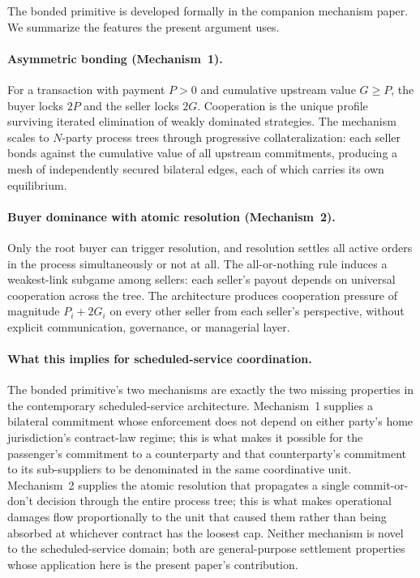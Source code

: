 \documentclass[11pt,a4paper]{article}
\theoremstyle{definition}
\theoremstyle{remark}
\newcommand{\pay}{P}
\newcommand{\cumval}{G}
\begin{document}
The bonded primitive is developed formally in the companion
mechanism paper. We summarize the features the present argument
uses.

\paragraph{Asymmetric bonding (Mechanism~1).}
For a transaction with payment $\pay > 0$ and cumulative upstream
value $\cumval \geq \pay$, the buyer locks $2\pay$ and the seller
locks $2\cumval$. Cooperation is the unique profile surviving
iterated elimination of weakly dominated strategies. The
mechanism scales to $N$-party process trees through progressive
collateralization: each seller bonds against the cumulative value
of all upstream commitments, producing a mesh of independently
secured bilateral edges, each of which carries its own
equilibrium.

\paragraph{Buyer dominance with atomic resolution (Mechanism~2).}
Only the root buyer can trigger resolution, and resolution
settles all active orders in the process simultaneously or not at
all. The all-or-nothing rule induces a weakest-link subgame among
sellers: each seller's payout depends on universal cooperation
across the tree. The architecture produces cooperation pressure
of magnitude $\pay_i + 2\cumval_i$ on every other seller from
each seller's perspective, without explicit communication,
governance, or managerial layer.

\paragraph{What this implies for scheduled-service coordination.}
The bonded primitive's two mechanisms are exactly the two missing
properties in the contemporary scheduled-service architecture.
Mechanism~1 supplies a bilateral commitment whose enforcement
does not depend on either party's home jurisdiction's contract-law
regime; this is what makes it possible for the passenger's
commitment to a counterparty and that counterparty's commitment
to its sub-suppliers to be denominated in the same coordinative
unit. Mechanism~2 supplies the atomic resolution that propagates
a single commit-or-don't decision through the entire process
tree; this is what makes operational damages flow proportionally
to the unit that caused them rather than being absorbed at
whichever contract has the loosest cap. Neither mechanism is
novel to the scheduled-service domain; both are general-purpose
settlement properties whose application here is the present
paper's contribution.
\end{document}
